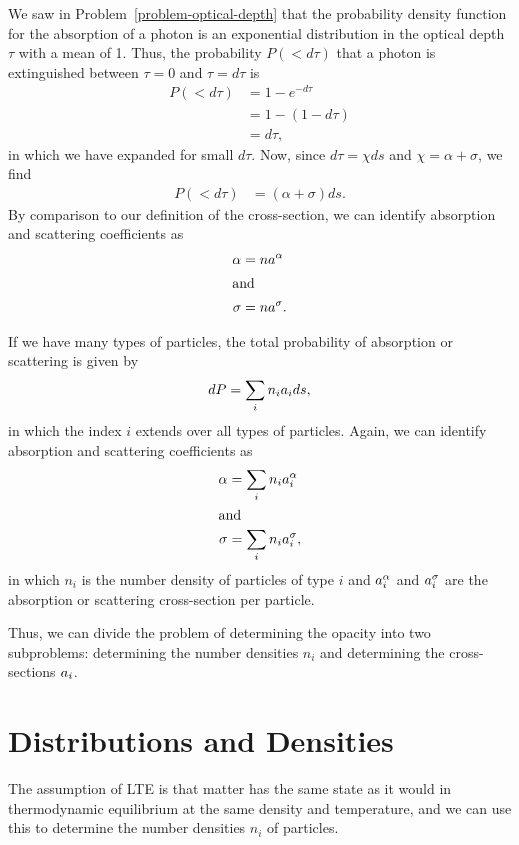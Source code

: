 \newslide

We saw in Problem~\ref{problem-optical-depth} that the probability density function for the absorption of a photon is an exponential distribution in the optical depth $\tau$ with a mean of 1. Thus, the probability $P(<d\tau)$ that a photon is extinguished between $\tau = 0$ and $\tau = d\tau$ is
\begin{align}
P(<d\tau) &= 1 - e^{-d\tau}\\
&= 1 - (1 - {d\tau})\\
&= {d\tau},
\end{align}
in which we have expanded for small $d\tau$.
Now, since $d\tau = \chi ds$ and $\chi = \alpha+ \sigma$, we find
\begin{align}
P(<d\tau) &= (\alpha + \sigma) ds.
\end{align}
By comparison to our definition of the cross-section, 
we can identify absorption and scattering coefficients as
\begin{align}
\alpha &= n a^\alpha\\
\intertext{and}
\sigma &= n a^\sigma.
\end{align}

If we have many types of particles, the total probability of absorption or scattering is given by
\begin{align}
dP = \sum_i n_i a_i ds,
\end{align}
in which the index $i$ extends over all types of
particles. Again, we can identify absorption and scattering coefficients as
\begin{align}
\alpha &= \sum_i n_i a^\alpha_i\\
\intertext{and}
\sigma &= \sum_i n_i a^\sigma_i,
\end{align}
in which $n_i$ is the number density of particles of type $i$ and
$a^\alpha_i$ and $a^\sigma_i$ are the absorption or scattering cross-section per
particle.

Thus, we can divide the problem of determining the opacity
into two subproblems: determining the number densities $n_i$ and determining
the cross-sections $a_i$.

\newslide

\section{Distributions and Densities}

The assumption of LTE is that matter has the same state as it would in
thermodynamic equilibrium at the same density and temperature, and we can use this to determine the number densities $n_i$ of particles. 

